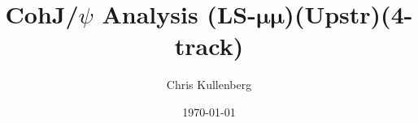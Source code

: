 \title{CohJ/$\psi$ Analysis (\textbf{LS}-$\boldsymbol{\mu\mu}$)(\textbf{Upstr})(\textbf{4-track})}
\author{Chris Kullenberg}
\date{\today}
